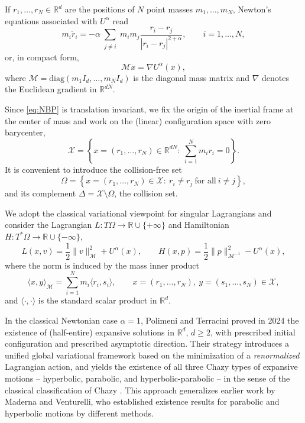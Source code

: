 \documentclass[a4paper,10pt]{amsart}
\theoremstyle{plain}
\theoremstyle{definition}
\numberwithin{equation}{section}
\numberwithin{thm}{section}
\begin{document}
If $r_1,\dots,r_N\in\mathbb{R}^d$ are the positions of $N$ point masses $m_1,\dots,m_N$, Newton's equations associated with $U^\alpha$ read
\begin{equation}\label{eq:newton}
m_i\ddot r_i
=
-\alpha\sum_{\substack{j\neq i}} m_i m_j \frac{r_i-r_j}{|r_i-r_j|^{2+\alpha}},
\qquad i=1,\dots,N,
\end{equation}
or, in compact form,
\begin{equation}\label{eq:NBP}
\mathcal{M}\ddot x=\nabla U^\alpha(x),
\end{equation}
where $\mathcal{M}=\mathrm{diag}(m_1 I_d,\dots,m_N I_d)$ is the diagonal mass matrix and $\nabla$ denotes the Euclidean gradient in $\mathbb{R}^{dN}$.

Since \eqref{eq:NBP} is translation invariant, we fix the origin of the inertial frame at the center of mass and work on the (linear) configuration space with zero barycenter,
\[
\mathcal{X}
=
\left\{
x=(r_1,\ldots,r_N)\in\mathbb{R}^{dN}:\ \sum_{i=1}^N m_i r_i=0
\right\}.
\]
It is convenient to introduce the collision-free set
\[
\Omega
=
\left\{
x=(r_1,\dots,r_N)\in\mathcal{X}:\ r_i\neq r_j\ \text{for all}\ i\neq j
\right\},
\]
and its complement $\Delta=\mathcal{X}\setminus\Omega$, the collision set.

We adopt the classical variational viewpoint for singular Lagrangians and consider the Lagrangian $L:T\Omega\to\mathbb{R}\cup\{+\infty\}$ and Hamiltonian $H:T^*\Omega\to\mathbb{R}\cup\{-\infty\}$,
\[
L(x,v)=\frac12\|v\|_{\mathcal{M}}^2+U^\alpha(x),
\qquad
H(x,p)=\frac12\|p\|_{\mathcal{M}^{-1}}^2-U^\alpha(x),
\]
where the norm is induced by the mass inner product
\[
\langle x,y\rangle_{\mathcal{M}}
=
\sum_{i=1}^N m_i\langle r_i,s_i\rangle,
\qquad
x=(r_1,\ldots,r_N),\ y=(s_1,\ldots,s_N)\in\mathcal{X},
\]
and $\langle\cdot,\cdot\rangle$ is the standard scalar product in $\mathbb{R}^d$.

\medskip

In the classical Newtonian case $\alpha=1$, Polimeni and Terracini \cite{PolimeniTerracini} proved in 2024 the existence of (half-entire) expansive solutions in $\mathbb{R}^d$, $d\ge 2$, with prescribed initial configuration and prescribed asymptotic direction. Their strategy introduces a unified global variational framework based on the minimization of a \emph{renormalized} Lagrangian action, and yields the existence of all three Chazy types of expansive motions -- hyperbolic, parabolic, and hyperbolic-parabolic -- in the sense of the classical classification of Chazy \cite{Chazy}. This approach generalizes earlier work by Maderna and Venturelli, who established existence results for parabolic \cite{MadernaVenturelli_GloballyMinimizingParabolic} and hyperbolic \cite{MadernaVenturelli_HyperbolicMotions} motions by different methods.
\end{document}
